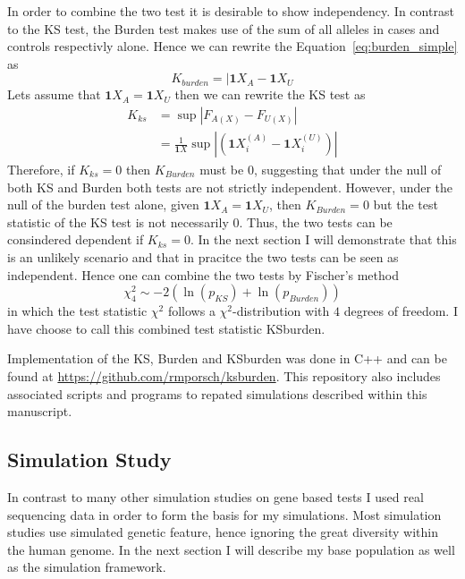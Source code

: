 In order to combine the two test it is desirable to show independency.
In contrast to the KS test, the Burden test makes use of the sum of all alleles in cases and controls respectivly alone.
Hence we can rewrite the Equation~\ref{eq:burden_simple} as
\begin{equation}
  K_{burden} =  |\pmb{1}X_{A}  - \pmb{1}X_{U}
\end{equation}
Lets assume that $\pmb{1}X_{A} = \pmb{1}X_{U}$ then we can rewrite the KS test as
\begin{equation}
  \begin{aligned}
    K_{ks} & = \sup |F_{A(X)} - F_{U(X)}|  \\
           & = \frac{1}{\pmb{1}X} \sup |(\pmb{1}X^{(A)}_i - \pmb{1}X^{(U)}_i)|
  \end{aligned}
\end{equation}
Therefore, if $K_{ks}=0$ then $K_{Burden}$ must be $0$, suggesting that under the null of both KS and Burden both tests are not strictly independent.
However, under the null of the burden test alone, given $\pmb{1}X_{A} = \pmb{1}X_{U}$, then $K_{Burden} = 0$ but the test statistic of the KS test is not necessarily $0$.
Thus, the two tests can be consindered dependent if $K_{ks} = 0$.
In the next section I will demonstrate that this is an unlikely scenario and that in pracitce the two tests can be seen as independent.
Hence one can combine the two tests by Fischer's method 
\begin{equation}
	\chi^2_4 \sim - 2 (\ln(p_{KS}) + \ln(p_{Burden}))
\end{equation}
in which the test statistic $\chi^2$ follows a $\chi^2$-distribution with $4$ degrees of freedom.
I have choose to call this combined test statistic KSburden.

Implementation of the KS, Burden and KSburden was done in C++ and can be found at \url{https://github.com/rmporsch/ksburden}.
This repository also includes associated scripts and programs to repated simulations described within this manuscript.

\subsection{Simulation Study}
\label{sub:simulation_study}

In contrast to many other simulation studies on gene based tests I used real sequencing data in order to form the basis for my simulations.
Most simulation studies use simulated genetic feature, hence ignoring the great diversity within the human genome.
In the next section I will describe my base population as well as the simulation framework.

